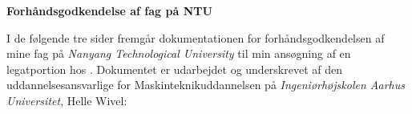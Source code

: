 \documentclass[../Ansoegning.tex]{subfiles}
\begin{document}
\begin{center}
    \Large{\textbf{Forhåndsgodkendelse af fag på NTU}}\vspace{-0.7cm}
\end{center}

I de følgende tre sider fremgår dokumentationen for forhåndsgodkendelsen af mine fag på \textit{Nanyang Technological University} til min ansøgning af en legatportion hos \textit{\FondNavn}. Dokumentet er udarbejdet og underskrevet af den uddannelsesansvarlige for Maskinteknikuddannelsen på \textit{Ingeniørhøjskolen Aarhus Universitet}, Helle Wivel:

\begin{minipage}{1\textwidth}

\end{minipage}
    \newpage

\begin{minipage}{1.0\textwidth}

\end{minipage}
    \newpage

\begin{minipage}{1.0\textwidth}

\end{minipage}
\end{document}
